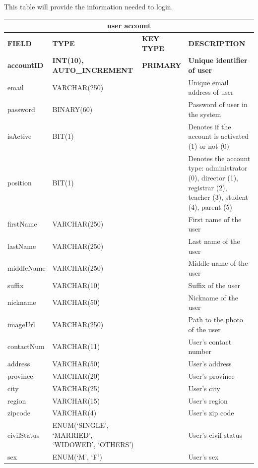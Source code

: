 \documentclass[11pt,a4paper,titlepage]{article}
\begin{document}
This table will provide the information needed to login.

\vspace{1cm}
\begin{longtable}{ |p{2.5cm}|p{4.5cm}|p{2.5cm}|p{3cm}|  }
    \hline
    \multicolumn{4}{|c|}{\textbf{user account}} \\
    \hline
    \textbf{FIELD}&\textbf{TYPE}&\textbf{KEY TYPE}&\textbf{DESCRIPTION}\\
    \hline
    \textbf{accountID}   & \textbf{INT(10), AUTO\_INCREMENT}   & \textbf{PRIMARY} & \textbf{Unique identifier of user}\\ \hline
    email & VARCHAR(250) & & Unique email address of user\\ \hline
    password & BINARY(60) & & Password of user in the system \\ \hline
    isActive & BIT(1) & & Denotes if the account is activated (1) or not (0)\\ \hline
    position & BIT(1) & & Denotes the account type: administrator (0), director (1), registrar (2), teacher (3), student (4), parent (5)\\ \hline
    firstName & VARCHAR(250) & & First name of the user \\ \hline
    lastName & VARCHAR(250) & & Last name of the user \\ \hline
    middleName & VARCHAR(250) & & Middle name of the user \\ \hline
    suffix & VARCHAR(10) & & Suffix of the user \\ \hline
    nickname & VARCHAR(50) & & Nickname of the user \\ \hline
    imageUrl & VARCHAR(250) & & Path to the photo of the user \\ \hline
    contactNum & VARCHAR(11) & & User's contact number \\ \hline
    address & VARCHAR(50) & & User's address \\ \hline
    province & VARCHAR(20) & & User's province \\ \hline
    city & VARCHAR(25) & & User's city \\ \hline
    region & VARCHAR(15) & & User's region \\ \hline
    zipcode & VARCHAR(4) & & User's zip code \\ \hline
    civilStatus & ENUM(`SINGLE', `MARRIED', `WIDOWED', `OTHERS') & & User's civil status \\ \hline
    sex & ENUM(`M', `F') & & User's sex \\ \hline

\end{longtable}
\end{document}
